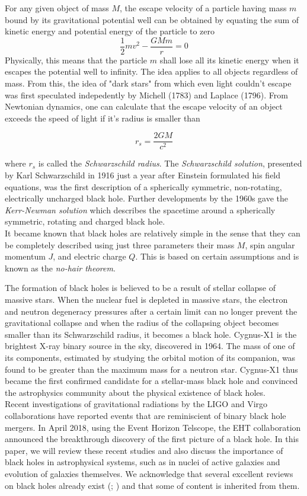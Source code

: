 \documentclass[twocolumn]{aastex63}
\newcommand{\f}[2]{\frac{#1}{#2}}
\begin{document}
For any given object of mass $M$, the escape velocity of a particle having mass $m$ bound by its gravitational potential well can be obtained by equating the sum of kinetic energy and potential energy of the particle to zero
$$ \f{1}{2}mv^2 - \f{GMm}{r} = 0$$
Physically, this means that the particle $m$ shall lose all its kinetic energy when it escapes the potential well to infinity. The idea applies to all objects regardless of mass. From this, the idea of "dark stars" from which even light couldn't escape was first speculated indepedently by Michell (1783) and Laplace (1796). From Newtonian dynamics, one can calculate that the escape velocity of an object exceeds the speed of light if it's radius is smaller than

$$
    r_s = \frac{2GM}{c^2} 
$$

where $r_s$ is called the \textit{Schwarzschild radius}. The \textit{Schwarzschild solution}, presented by Karl Schwarzschild in 1916 just a year after Einstein formulated his field equations, was the first description of a spherically symmetric, non-rotating, electrically uncharged black hole. Further developments by the 1960s gave the \textit{Kerr-Newman solution} which describes the spacetime around a spherically symmetric, rotating and charged black hole.\\

It became known that black holes are relatively simple in the sense that they can be completely described using just three parameters \textemdash their mass $M$, spin angular momentum $J$, and electric charge $Q$. This is based on certain assumptions and is known as the \textit{no-hair theorem}.

The formation of black holes is believed to be a result of stellar collapse of massive stars. When the nuclear fuel is depleted in massive stars, the electron and neutron degeneracy pressures after a certain limit can no longer prevent the gravitational collapse and when the radius of the collapsing object becomes smaller than its Schwarzschild radius, it becomes a black hole. Cygnus-X1 is the brightest X-ray binary source in the sky, discovered in 1964. The mass of one of its components, estimated by studying the orbital motion of its companion, was found to be greater than the maximum mass for a neutron star. Cygnus-X1 thus became the first confirmed candidate for a stellar-mass black hole and convinced the astrophysics community about the physical existence of black holes.\\

Recent investigations of gravitational radiations by the LIGO and Virgo collaborations have reported events that are reminiscient of binary black hole mergers. In April 2018, using the Event Horizon Telscope, the EHT collaboration announced the breakthrough discovery of the first picture of a black hole. In this paper, we will review these recent studies and also discuss the importance of black holes in astrophysical systems, such as in nuclei of active galaxies and evolution of galaxies themselves. We acknowledge that several excellent reviews on black holes already exist (\cite{bambi2019astrophysical}; \cite{Capelo_2019}) and that some of content is inherited from them.
\end{document}
